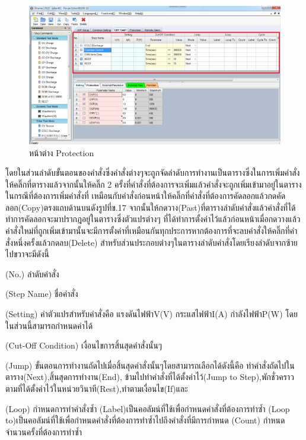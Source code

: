 \begin{center}
	\begin{figure}[H]
		\includegraphics[width=1\linewidth]{Chapters/img/17020_Program/Recipe_Editor/UUT_tesing_page.png}
		\centering
		\captionsetup{justification=centering,margin=2cm}
		\caption{หน้าต่าง Protection}
	\end{figure}
\end{center}
โดยในส่วนลำดับขั้นตอนของคำสั่งซึ่งคำสั่งต่างๆจะถูกจัดลำดับการทำงานเป็นตารางซึ่งในการเพิ่มคำสั่งให้คลิ๊กที่ตารางแล้วจากนั้นให้คลิ๊ก 2 ครั้งที่คำสั่งที่ต้องการจะเพิ่มแล้วคำสั่งจะถูกเพิ่มเข้ามาอยู่ในตารางในกรณีที่ต้องการเพิ่มคำสั่งที่
เหมือนกับคำสั่งก่อนหน้าให้คลิ๊กที่คำสั่งที่ต้องการคัดลอกแล้วกดคัดลอก(Copy)ตรงแถบด้านบนดังรูปที่ข.17 จากนั้นให้กดวาง(Past)ที่ตารางลำดับคำสั่งแล้วคำสั่งที่ได้ทำการคัดลอกจะมาปรากฎอยู่ในตารางซึ่งตัวแปรต่างๆ
ที่ได้ทำการตั้งค่าไว้แล้วก่อนหน้าเมื่อกดวางแล้วคำสั่งใหม่ที่ถูกเพิ่มเข้ามานั้นจะมีการตั้งค่าที่เหมือนกันทุกประการหากต้องการที่จะลบคำสั่งให้คลิ๊กที่คำสั่งหนึ่งครั้งแล้วกดลบ(Delete) 
\newline \hspace*{2cm}
สำหรับส่วนประกอบต่างๆในตารางลำดับคำสั่งโดยเรียงลำดับจากซ้ายไปขวาจะมีดังนี้
\begin{itemize}
{\item (No.) ลำดับคำสั่ง}
{\item (Step Name) ชื่อคำสั่ง}
{\item (Setting) ค่าตัวแปรสำหรับคำสั่งคือ แรงดันไฟฟ้าV(V) กระแสไฟฟ้าI(A) กำลังไฟฟ้าP(W) โดยในส่วนนี้สามารถกำหนดค่าได้}
{\item (Cut-Off Condition) เงื่อนไขการสิ้นสุดคำสั่งนั้นๆ}
{\item (Jump) ขั้นตอนการทำงานถัดไปเมื่อสิ้นสุดคำสั่งนั้นๆโดยสามารถเลือกได้ดังนี้คือ ทำคำสั่งถัดไปในตาราง(Next),\newline สิ้นสุดการทำงาน(End), 
ข้ามไปทำคำสั่งที่ได้ตั้งค่าไว้(Jump to Step),พักชั่วคราวตามที่ได้ตั้งค่าไว้ในหน่วยวินาที(Rest),ทำตามเงื่อนไข(If)และ}
{\item (Loop) กำหนดการทำคำสั่งซ้ำ (Label)เป็นคอลัมน์ที่ใช้เพื่อกำหนดคำสั่งที่ต้องการทำซ้ำ (Loop to)เป็นคอลัมน์ที่ใช้เพื่อกำหนดคำสั่งที่ต้องการทำซ้ำไปถึงคำสั่งที่มีการกำหนด\newline
	    (Count) กำหนดจำนวนครั้งที่ต้องการทำซ้ำ}
\end{itemize}
